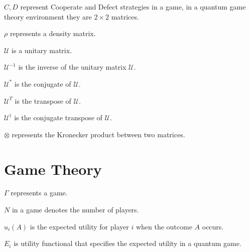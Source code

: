 $C, D$ represent Cooperate and Defect strategies in a game, in a quantum game theory environment they are $2 \times 2$ matrices.

$\rho$ represents a density matrix.

$\mathcal{U}$ is a unitary matrix.

$\mathcal{U}^{-1}$ is the inverse of the unitary matrix $\mathcal{U}$.

$\mathcal{U}^{*}$ is the conjugate of $\mathcal{U}$.

$\mathcal{U}^{T}$ is the transpose of $\mathcal{U}$.

$\mathcal{U}^{\dagger}$ is the conjugate transpose of $\mathcal{U}$.

$\otimes$ represents the Kronecker product between two matrices.


\section{Game Theory}

$\Gamma$ represents a game.

$N$ in a game denotes the number of players.

$u_{i}(A)$ is the expected utility for player $i$ when the outcome $A$ occurs.

$E_{i}$ is utility functional that specifies the expected utility in a quantum game.

\clearpage
\thispagestyle{empty}

\cleardoublepage
